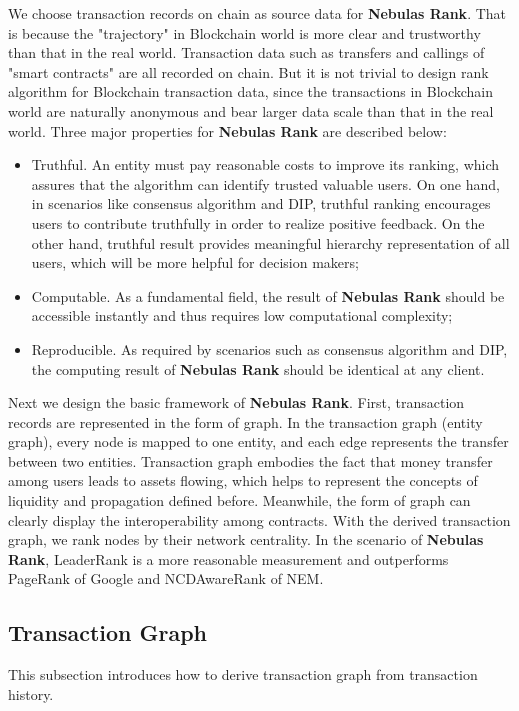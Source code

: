 We choose transaction records on chain as source data for \textbf{Nebulas Rank}. That is because the "trajectory" in Blockchain world is more clear and trustworthy than that in the real world. Transaction data such as transfers and callings of "smart contracts" are all recorded on chain. But it is not trivial to design rank algorithm for Blockchain transaction data, since the transactions in Blockchain world are naturally anonymous and bear larger data scale than that in the real world. Three major properties for \textbf{Nebulas Rank} are described below:
\begin{itemize}
	\item Truthful. An entity must pay reasonable costs to improve its ranking, which assures that the algorithm can identify trusted valuable users. On one hand, in scenarios like consensus algorithm and DIP, truthful ranking encourages users to contribute truthfully in order to realize positive feedback. On the other hand, truthful result provides meaningful hierarchy representation of all users, which will be more helpful for decision makers;
	\item Computable. As a fundamental field, the result of \textbf{Nebulas Rank} should be accessible instantly and thus requires low computational complexity;
	\item Reproducible. As required by scenarios such as consensus algorithm and DIP, the computing result of \textbf{Nebulas Rank} should be identical at any client.
\end{itemize}

Next we design the basic framework of \textbf{Nebulas Rank}. First, transaction records are represented in the form of graph. In the transaction graph (entity graph), every node is mapped to one entity, and each edge represents the transfer between two entities\cite{Tschorsch2015}. Transaction graph embodies the fact that money transfer among users leads to assets flowing, which helps to represent the concepts of liquidity and propagation defined before. Meanwhile, the form of graph can clearly display the interoperability among contracts. With the derived transaction graph, we rank nodes by their network centrality. In the scenario of \textbf{Nebulas Rank}, LeaderRank\cite{Chen2013}\cite{Li2014} is a more reasonable measurement and outperforms PageRank of Google and NCDAwareRank of NEM\cite{nem}.

\subsection{Transaction Graph} \label{subsec:txg}
This subsection introduces how to derive transaction graph from transaction history.

